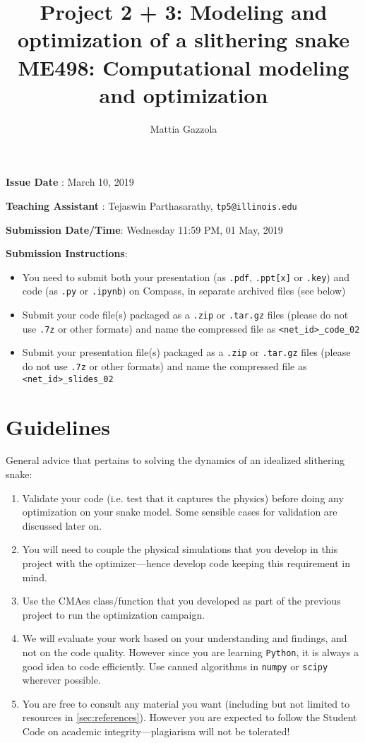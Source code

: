 \documentclass[11pt]{article}
\author{Mattia Gazzola}
\date{}
\title{Project 2 + 3: Modeling and optimization of a slithering snake\\\medskip
\large ME498: Computational modeling and optimization}
\begin{document}
\maketitle
\textbf{Issue Date} : March 10, 2019

\textbf{Teaching Assistant} : Tejaswin Parthasarathy, \texttt{tp5@illinois.edu}

\textbf{Submission Date/Time}: Wednesday 11:59 PM, 01 May, 2019

\textbf{Submission Instructions}:
\begin{itemize}
\item You need to submit both your presentation (as \texttt{.pdf}, \texttt{.ppt[x]} or \texttt{.key}) and code
(as \texttt{.py} or \texttt{.ipynb}) on Compass, in separate archived files (see below)
\item Submit your code file(s) packaged as a \texttt{.zip} or \texttt{.tar.gz} files (please do not use
\texttt{.7z} or other formats) and name the compressed file as \texttt{<net\_id>\_code\_02}
\item Submit your presentation file(s) packaged as a \texttt{.zip} or \texttt{.tar.gz} files (please do not use
\texttt{.7z} or other formats) and name the compressed file as \texttt{<net\_id>\_slides\_02}
\end{itemize}

\newpage

\section{Guidelines}
\label{sec:orge5d2764}
General advice that pertains to solving the dynamics of an idealized
slithering snake:
\begin{enumerate}
\item Validate your code (i.e. test that it captures the physics) before doing
any optimization on your snake model. Some sensible cases for validation are
discussed later on.
\item You will need to couple the physical simulations that you develop in this
project with the optimizer---hence develop code keeping this requirement in mind.
\item Use the CMAes class/function that you developed as part of the previous
project to run the optimization campaign.
\item We will evaluate your work based on your understanding and findings, and
not on the code quality. However since you are learning \texttt{Python}, it is
always a good idea to code efficiently. Use canned algorithms in \texttt{numpy} or
\texttt{scipy} wherever possible.
\item You are free to consult any material you want (including but not limited to
resources in \cref{sec:references}). However you are expected to follow the
Student Code on academic integrity---plagiarism will not be tolerated!
\end{enumerate}
\end{document}
